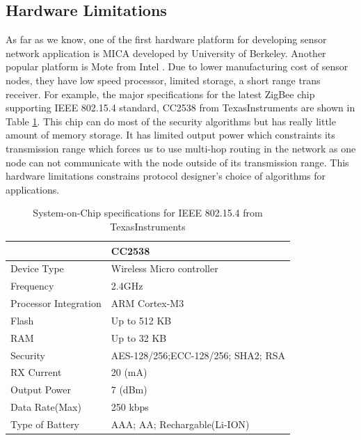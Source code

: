 	\subsection{Hardware Limitations}
		As far as we know, one of the first hardware platform for developing sensor network application is MICA \cite{hill2002mica} developed by University of Berkeley.
		Another popular platform is Mote from Intel \cite{arazi2006self}.
		Due to lower manufacturing cost of sensor nodes, they have low speed processor, limited storage, a short range trans receiver.
		For example, the major specifications for the latest ZigBee chip supporting IEEE 802.15.4 standard, CC2538 from TexasInstruments are shown in Table \ref{table:soc}.
		This chip can do most of the security algorithms but has really little amount of memory storage. It has limited output power which constraints its transmission range which forces us to use multi-hop routing in the network as one node can not communicate with the node outside of its transmission range.
		This hardware limitations constrains protocol designer's choice of algorithms for applications.  
	\begin{table}[!htb]	
		\begin{center}
			\begin{tabular}{ |l| l| }
				\hline
			     & CC2538 \\
			    \hline
			    Device Type & Wireless Micro controller \\
			    Frequency & 2.4GHz \\
			    Processor Integration & ARM Cortex-M3 \\
					Flash & Up to 512 KB \\
					RAM & Up to 32 KB \\
					Security & AES-128/256;ECC-128/256; SHA2; RSA \\
					RX Current & 20 (mA) \\
					Output Power & 7 (dBm) \\
					Data Rate(Max) & 250 kbps \\
					Type of Battery & AAA; AA; Rechargable(Li-ION) \\
			    \hline
			\end{tabular}
		\end{center}
		 \caption{System-on-Chip specifications for IEEE 802.15.4 from TexasInstruments}
		 \label{table:soc}
	\end{table}
	
